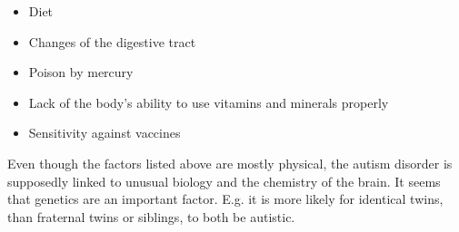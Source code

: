 \begin{itemize}
  
  \item{Diet}
  \item{Changes of the digestive tract}
  \item{Poison by mercury}
  \item{Lack of the body's ability to use vitamins and minerals properly}
  \item{Sensitivity against vaccines}
  
\end{itemize}

Even though the factors listed above are mostly physical, the autism disorder is supposedly linked to unusual biology and the chemistry of the brain.
It seems that genetics are an important factor. E.g. it is more likely for identical twins, than fraternal twins or siblings, to both be autistic.
